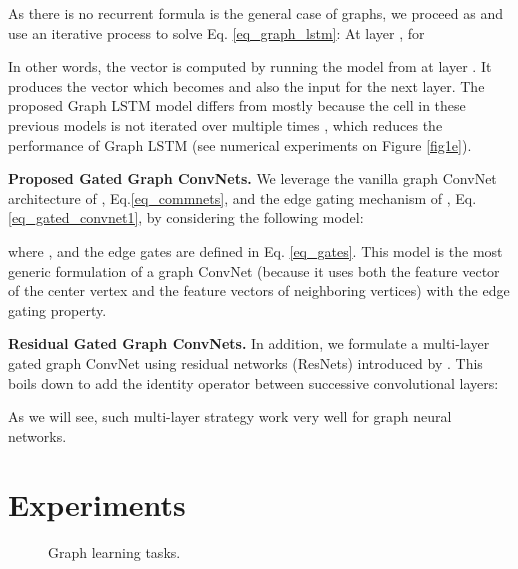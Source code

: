 \documentclass{article} \usepackage{iclr2018_conference,times}
\begin{document}
As there is no recurrent formula is the general case of graphs, we proceed as \cite{art:ScarselliGoriTsoiHagenbuchnerMonfardini09} and use an iterative process to solve Eq. \eqref{eq_graph_lstm}: At layer , for 


In other words, the vector  is computed by running the model  from  at layer . It produces the vector  which becomes   and also the input  for the next layer. The proposed Graph LSTM model differs from \cite{liang2016semantic,peng2017cross} mostly because the cell  in these previous models is not iterated over multiple times , which reduces the performance of Graph LSTM (see numerical experiments on Figure \ref{fig1e}).


{\bf Proposed Gated Graph ConvNets. } We leverage the vanilla graph ConvNet architecture of \cite{art:SukhbaatarSzlamFergus16ComAgents}, Eq.\eqref{eq_commnets}, and the edge gating mechanism of \cite{marcheggiani2017encoding}, Eq.\eqref{eq_gated_convnet1}, by considering the following model:

where , and the edge gates  are defined in Eq. \eqref{eq_gates}. This model is the most generic formulation of a graph ConvNet (because it uses both the feature vector  of the center vertex and the feature vectors  of neighboring vertices) with the edge gating property. 




{\bf Residual Gated Graph ConvNets. } In addition, we formulate a multi-layer gated graph ConvNet using residual networks (ResNets) introduced by \cite{art:HeZhangRenSun16ResNet}. This boils down to add the identity operator between successive convolutional layers:

As we will see, such multi-layer strategy work very well for graph neural networks.  








\section{Experiments}
\label{sec4}


\begin{figure}[h!]
\centering
{}
\hspace{0.5cm}
\caption{Graph learning tasks.}
\label{fig2}
\end{figure}
\end{document}
